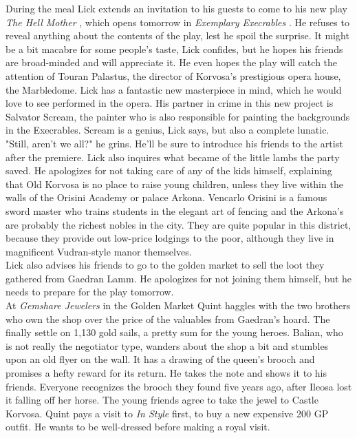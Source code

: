 During the meal Lick extends an invitation to his guests to come to his new play {\itshape The Hell Mother} , which opens tomorrow in  {\itshape Exemplary Execrables} . He refuses to reveal anything about the contents of the play, lest he spoil the surprise. It might be a bit macabre for some people's taste, Lick confides, but he hopes his friends are broad-minded and will appreciate it. He even hopes the play will catch the attention of Touran Palastus, the director of Korvosa's prestigious opera house, the Marbledome. Lick has a fantastic new masterpiece in mind, which he would love to see performed in the opera. His partner in crime in this new project is Salvator Scream, the painter who is also responsible for painting the backgrounds in the Execrables. Scream is a genius, Lick says, but also a complete lunatic. "Still, aren't we all?" he grins. He'll be sure to introduce his friends to the artist after the premiere. Lick also inquires what became of the little lambs the party saved. He apologizes for not taking care of any of the kids himself, explaining that Old Korvosa is no place to raise young children, unless they live within the walls of the Orisini Academy or palace Arkona. Vencarlo Orisini is a famous sword master who trains students in the elegant art of fencing and the Arkona's are probably the richest nobles in the city. They are quite popular in this district, because they provide out low-price lodgings to the poor, although they live in magnificent Vudran-style manor themselves.\\

Lick also advises his friends to go to the golden market to sell the loot they gathered from Gaedran Lamm. He apologizes for not joining them himself, but he needs to prepare for the play tomorrow.\\

At {\itshape Gemshare Jewelers} in the Golden Market Quint haggles with the two brothers who own the shop over the price of the valuables from Gaedran's hoard. The finally settle on 1,130 gold sails, a pretty sum for the young heroes. Balian, who is not really the negotiator type, wanders about the shop a bit and stumbles upon an old flyer on the wall. It has a drawing of the queen's brooch and promises a hefty reward for its return. He takes the note and shows it to his friends. Everyone recognizes the brooch they found five years ago, after Ileosa lost it falling off her horse. The young friends agree to take the jewel to Castle Korvosa. Quint pays a visit to  {\itshape In Style} first, to buy a new expensive 200 GP outfit. He wants to be well-dressed before making a royal visit. 
